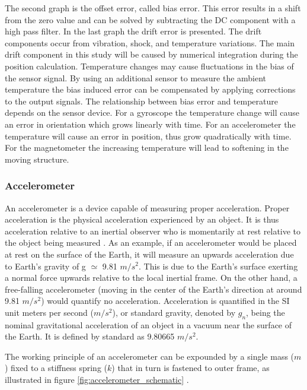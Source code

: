 The second graph is the offset error, called bias error. This error results in a shift from the zero value and can be solved by subtracting the DC component with a high pass filter. In the last graph the drift error is presented. The drift components occur from vibration, shock, and temperature variations. The main drift component in this study will be caused by numerical integration during the position calculation.
Temperature changes may cause fluctuations in the bias of the sensor signal. By using an additional sensor to measure the ambient temperature the bias induced error can be compensated by applying corrections to the output signals. The relationship between bias error and temperature depends on the sensor device. For a gyroscope the temperature change will cause an error in orientation which grows linearly with time. For an accelerometer the temperature will cause an error in position, thus grow quadratically with time. For the magnetometer the increasing temperature will lead to softening in the moving structure.

\subsubsection{Accelerometer}

An accelerometer is a device capable of measuring proper acceleration. Proper acceleration is the physical acceleration experienced by an object. It is thus acceleration relative to an inertial observer who is momentarily at rest relative to the object being measured \cite{pons2019observers}. As an example, if an accelerometer would be placed at rest on the surface of the Earth, it will measure an upwards acceleration due to Earth's gravity of g $\simeq$ 9.81 $m/s^2$. This is due to the Earth's surface exerting a normal force upwards relative to the local inertial frame. On the other hand, a free-falling accelerometer (moving in the center of the Earth's direction at around 9.81 $m/s^2$) would quantify no acceleration. Acceleration is quantified in the SI unit meters per second ($m/s^2$), or standard gravity, denoted by $g_n$, being the nominal gravitational acceleration of an object in a vacuum near the surface of the Earth. It is defined by standard as 9.80665 $m/s^2$.

The working principle of an accelerometer can be expounded by a single mass ($m$) fixed to a stiffness spring ($k$) that in turn is fastened to outer frame, as illustrated in figure \ref{fig:accelerometer_schematic} \cite{roylance1979batch}.

